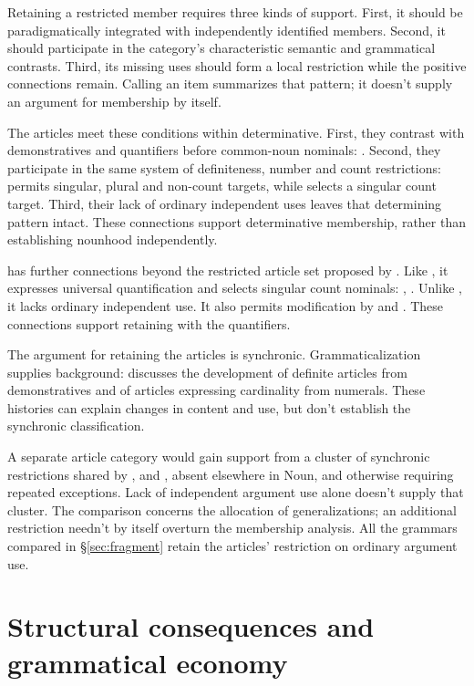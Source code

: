 \documentclass[12pt]{article}
\begin{document}
Retaining a restricted member requires three kinds of support. First, it should be paradigmatically integrated with independently identified members. Second, it should participate in the category's characteristic semantic and grammatical contrasts. Third, its missing uses should form a local restriction while the positive connections remain. Calling an item  summarizes that pattern; it doesn't supply an argument for membership by itself.

The articles meet these conditions within determinative. First, they contrast with demonstratives and quantifiers before common-noun nominals: . Second, they participate in the same system of definiteness, number and count restrictions:  permits singular, plural and non-count targets, while  selects a singular count target. Third, their lack of ordinary independent uses leaves that determining pattern intact. These connections support determinative membership, rather than establishing nounhood independently.

 has further connections beyond the restricted article set proposed by \textcite{spinillo2004reconceptualising}. Like , it expresses universal quantification and selects singular count nominals: , . Unlike , it lacks ordinary independent use. It also permits modification by  and . These connections support retaining  with the quantifiers.

The argument for retaining the articles is synchronic. Grammaticalization supplies background: \textcite[331--336]{lyons1999} discusses the development of definite articles from demonstratives and of articles expressing cardinality from numerals. These histories can explain changes in content and use, but don't establish the synchronic classification.

A separate article category would gain support from a cluster of synchronic restrictions shared by ,  and , absent elsewhere in Noun, and otherwise requiring repeated exceptions. Lack of independent argument use alone doesn't supply that cluster. The comparison concerns the allocation of generalizations; an additional restriction needn't by itself overturn the membership analysis. All the grammars compared in §\ref{sec:fragment} retain the articles' restriction on ordinary argument use.

\section{Structural consequences and grammatical economy}\label{sec:economy}
\end{document}
